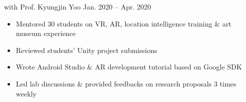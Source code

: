     {{\bodyfontsize \color{body} with} Prof. Kyungjin Yoo}
    {Jan. 2020 -- Apr. 2020}
    {}{}
\begin{itemize}
    \item Mentored 30 students on VR, AR, location intelligence training \& art museum experience

    \item Reviewed students' Unity project submissions

    \item Wrote Android Studio \& AR development tutorial based on Google SDK

    \item Led lab discussions \& provided feedbacks on research proposals 3 times weekly
\end{itemize}
\dividerSmall


